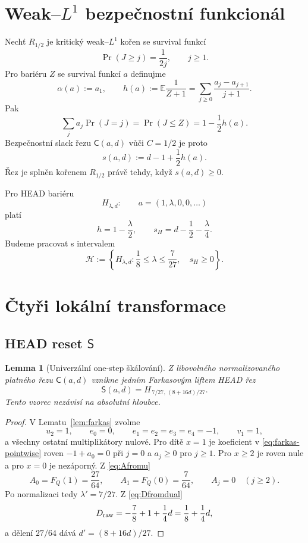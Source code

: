 \documentclass[11pt,a4paper]{article}
\newtheorem{lemma}[theorem]{Lemma}
\theoremstyle{remark}
\newcommand{\FQ}{F_Q}
\newcommand{\HH}{\mathcal H}
\newcommand{\Sop}{\mathsf S}
\begin{document}
\section{Weak--$L^1$ bezpečnostní funkcionál}

Nechť $R_{1/2}$ je kritický weak--$L^1$ kořen se survival funkcí
\[
\Pr(J\ge j)=\frac1{2j},\qquad j\ge1.
\]
Pro bariéru $Z$ se survival funkcí $a$ definujme
\[
\alpha(a):=a_1,
\qquad
h(a):=\mathbb E\frac1{Z+1}
=\sum_{j\ge0}\frac{a_j-a_{j+1}}{j+1}.
\]
Pak
\begin{equation}\label{eq:weak-eval}
\sum_ja_j\Pr(J=j)
=\Pr(J\le Z)
=1-\frac12h(a).
\end{equation}
Bezpečnostní slack řezu $\mathsf C(a,d)$ vůči $C=1/2$ je proto
\begin{equation}\label{eq:slack-general}
s(a,d):=d-1+\frac12h(a).
\end{equation}
Řez je splněn kořenem $R_{1/2}$ právě tehdy, když $s(a,d)\ge0$.

Pro HEAD bariéru
\[
H_{\lambda,d}:\qquad a=(1,\lambda,0,0,\ldots)
\]
platí
\[
h=1-\frac\lambda2,
\qquad
s_H=d-\frac12-\frac\lambda4.
\]
Budeme pracovat s intervalem
\begin{equation}\label{eq:Hcone}
\boxed{
\HH:=\left\{H_{\lambda,d}:\frac18\le\lambda\le\frac7{27},\quad
s_H\ge0\right\}.}
\end{equation}

\section{Čtyři lokální transformace}

\subsection{HEAD reset $\Sop$}

\begin{lemma}[Univerzální one-step škálování]\label{lem:S}
Z libovolného normalizovaného platného řezu $\mathsf C(a,d)$ vznikne jedním
Farkasovým liftem HEAD řez
\begin{equation}\label{eq:Smap}
\boxed{
\Sop(a,d)=H_{\,7/27,\,(8+16d)/27}.}
\end{equation}
Tento vzorec nezávisí na absolutní hloubce.
\end{lemma}

\begin{proof}
V Lematu~\ref{lem:farkas} zvolme
\[
u_2=1,
\qquad
e_0=0,
\qquad e_1=e_2=e_3=e_4=-1,
\qquad v_{1}=1,
\]
a všechny ostatní multiplikátory nulové. Pro dítě $x=1$ je koeficient
v \eqref{eq:farkas-pointwise} roven $-1+a_0=0$ při $j=0$ a $a_j\ge0$
pro $j\ge1$. Pro $x\ge2$ je roven nule a pro $x=0$ je nezáporný.
Z \eqref{eq:Afromu}
\[
A_0=\FQ(1)=\frac{27}{64},
\qquad
A_1=\FQ(0)=\frac7{64},
\qquad
A_j=0\quad(j\ge2).
\]
Po normalizaci tedy $\lambda'=7/27$. Z \eqref{eq:Dfromdual}
\[
D_{\rm raw}=-\frac78+1+\frac14d=\frac18+\frac14d,
\]
a dělení $27/64$ dává $d'=(8+16d)/27$.
\end{proof}
\end{document}
